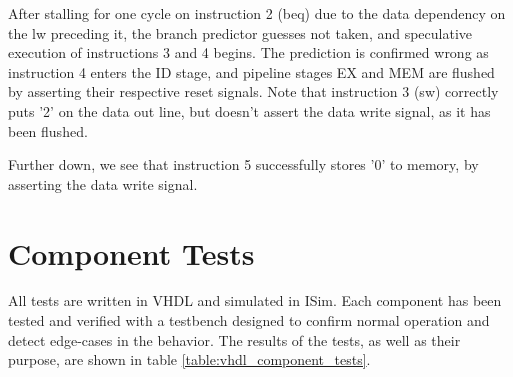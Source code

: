 After stalling for one cycle on instruction 2 (beq) due to the data dependency on the lw preceding it, the branch predictor guesses not taken, and speculative execution of instructions 3 and 4 begins.
The prediction is confirmed wrong as instruction 4 enters the ID stage, and pipeline stages EX and MEM are flushed by asserting their respective reset signals.
Note that instruction 3 (sw) correctly puts '2' on the data out line, but doesn't assert the data write signal, as it has been flushed.

Further down, we see that instruction 5 successfully stores '0' to memory, by asserting the data write signal.

\section{Component Tests}

All tests are written in VHDL and simulated in ISim.
Each component has been tested and verified with a testbench designed to confirm normal operation and detect edge-cases in the behavior.
The results of the tests, as well as their purpose, are shown in table \ref{table:vhdl_component_tests}.

